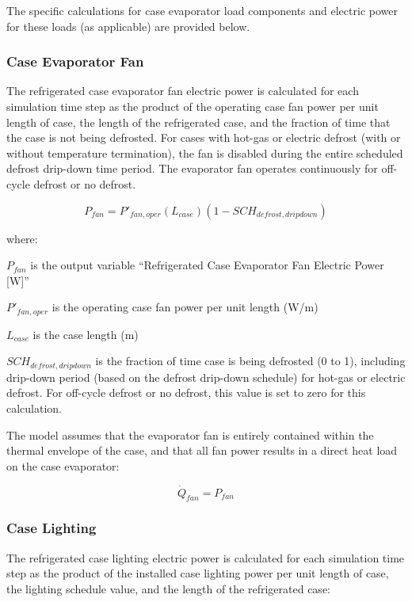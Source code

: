 The specific calculations for case evaporator load components and electric power for these loads (as applicable) are provided below.

\subsubsection{Case Evaporator Fan}\label{case-evaporator-fan}

The refrigerated case evaporator fan electric power is calculated for each simulation time step as the product of the operating case fan power per unit length of case, the length of the refrigerated case, and the fraction of time that the case is not being defrosted. For cases with hot-gas or electric defrost (with or without temperature termination), the fan is disabled during the entire scheduled defrost drip-down time period. The evaporator fan operates continuously for off-cycle defrost or no defrost.

\begin{equation}
{P_{fan}} = {P'}_{fan,oper}\left( {{L_{case}}} \right)\left( {1 - SC{H_{defrost,dripdown}}} \right)
\end{equation}

where:

\({P_{fan}}\) is the output variable ``Refrigerated Case Evaporator Fan Electric Power {[}W{]}''

\({P'}_{fan,oper}\) is the operating case fan power per unit length (W/m)

\({L_{case}}\) is the case length (m)

\(SC{H_{defrost,dripdown}}\) is the fraction of time case is being defrosted (0 to 1), including drip-down period (based on the defrost drip-down schedule) for hot-gas or electric defrost. For off-cycle defrost or no defrost, this value is set to zero for this calculation.

The model assumes that the evaporator fan is entirely contained within the thermal envelope of the case, and that all fan power results in a direct heat load on the case evaporator:

\begin{equation}
{\dot Q_{fan}} = {P_{fan}}
\end{equation}

\subsubsection{Case Lighting}\label{case-lighting}

The refrigerated case lighting electric power is calculated for each simulation time step as the product of the installed case lighting power per unit length of case, the lighting schedule value, and the length of the refrigerated case:

